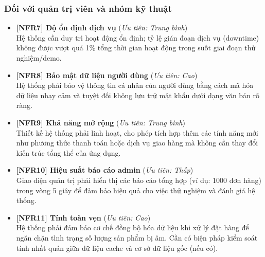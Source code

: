 \subsubsection{Đối với quản trị viên và nhóm kỹ thuật}

\begin{itemize}
    \item \textbf{[NFR7] Độ ổn định dịch vụ} \hfill (\textit{Ưu tiên: Trung bình})\\
    Hệ thống cần duy trì hoạt động ổn định; tỷ lệ gián đoạn dịch vụ (downtime) không được vượt quá 1\% tổng thời gian hoạt động trong suốt giai đoạn thử nghiệm/demo.

\item \textbf{[NFR8] Bảo mật dữ liệu người dùng} \hfill (\textit{Ưu tiên: Cao})\\
    Hệ thống phải bảo vệ thông tin cá nhân của người dùng bằng cách mã hóa dữ liệu nhạy cảm và tuyệt đối không lưu trữ mật khẩu dưới dạng văn bản rõ ràng.

\item \textbf{[NFR9] Khả năng mở rộng} \hfill (\textit{Ưu tiên: Trung bình})\\
    Thiết kế hệ thống phải linh hoạt, cho phép tích hợp thêm các tính năng mới như phương thức thanh toán hoặc dịch vụ giao hàng mà không cần thay đổi kiến trúc tổng thể của ứng dụng.

\item \textbf{[NFR10] Hiệu suất báo cáo admin} \hfill (\textit{Ưu tiên: Thấp})\\
    Giao diện quản trị phải hiển thị các báo cáo tổng hợp (ví dụ: 1000 đơn hàng) trong vòng 5 giây để đảm bảo hiệu quả cho việc thử nghiệm và đánh giá hệ thống.

\item \textbf{[NFR11] Tính toàn vẹn} \hfill (\textit{Ưu tiên: Cao})\\
    Hệ thống phải đảm bảo cơ chế đồng bộ hóa dữ liệu khi xử lý đặt hàng để ngăn chặn tình trạng số lượng sản phẩm bị âm. Cần có biện pháp kiểm soát tính nhất quán giữa dữ liệu cache và cơ sở dữ liệu gốc (nếu có).

\end{itemize}


